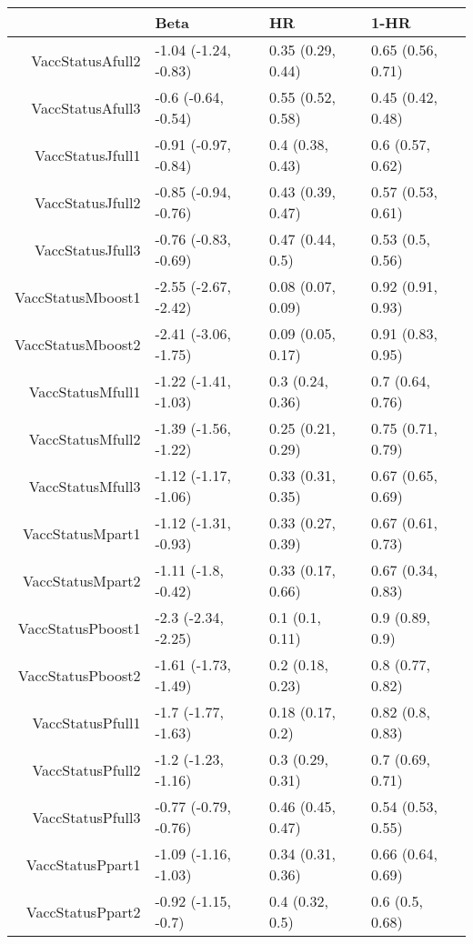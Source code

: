 \begin{table}[ht]
\centering
\begin{tabular}{rlll}
  \hline
 & Beta & HR & 1-HR \\ 
  \hline
VaccStatusAfull2 & -1.04 (-1.24, -0.83) & 0.35 (0.29, 0.44) & 0.65 (0.56, 0.71) \\ 
  VaccStatusAfull3 & -0.6 (-0.64, -0.54) & 0.55 (0.52, 0.58) & 0.45 (0.42, 0.48) \\ 
  VaccStatusJfull1 & -0.91 (-0.97, -0.84) & 0.4 (0.38, 0.43) & 0.6 (0.57, 0.62) \\ 
  VaccStatusJfull2 & -0.85 (-0.94, -0.76) & 0.43 (0.39, 0.47) & 0.57 (0.53, 0.61) \\ 
  VaccStatusJfull3 & -0.76 (-0.83, -0.69) & 0.47 (0.44, 0.5) & 0.53 (0.5, 0.56) \\ 
  VaccStatusMboost1 & -2.55 (-2.67, -2.42) & 0.08 (0.07, 0.09) & 0.92 (0.91, 0.93) \\ 
  VaccStatusMboost2 & -2.41 (-3.06, -1.75) & 0.09 (0.05, 0.17) & 0.91 (0.83, 0.95) \\ 
  VaccStatusMfull1 & -1.22 (-1.41, -1.03) & 0.3 (0.24, 0.36) & 0.7 (0.64, 0.76) \\ 
  VaccStatusMfull2 & -1.39 (-1.56, -1.22) & 0.25 (0.21, 0.29) & 0.75 (0.71, 0.79) \\ 
  VaccStatusMfull3 & -1.12 (-1.17, -1.06) & 0.33 (0.31, 0.35) & 0.67 (0.65, 0.69) \\ 
  VaccStatusMpart1 & -1.12 (-1.31, -0.93) & 0.33 (0.27, 0.39) & 0.67 (0.61, 0.73) \\ 
  VaccStatusMpart2 & -1.11 (-1.8, -0.42) & 0.33 (0.17, 0.66) & 0.67 (0.34, 0.83) \\ 
  VaccStatusPboost1 & -2.3 (-2.34, -2.25) & 0.1 (0.1, 0.11) & 0.9 (0.89, 0.9) \\ 
  VaccStatusPboost2 & -1.61 (-1.73, -1.49) & 0.2 (0.18, 0.23) & 0.8 (0.77, 0.82) \\ 
  VaccStatusPfull1 & -1.7 (-1.77, -1.63) & 0.18 (0.17, 0.2) & 0.82 (0.8, 0.83) \\ 
  VaccStatusPfull2 & -1.2 (-1.23, -1.16) & 0.3 (0.29, 0.31) & 0.7 (0.69, 0.71) \\ 
  VaccStatusPfull3 & -0.77 (-0.79, -0.76) & 0.46 (0.45, 0.47) & 0.54 (0.53, 0.55) \\ 
  VaccStatusPpart1 & -1.09 (-1.16, -1.03) & 0.34 (0.31, 0.36) & 0.66 (0.64, 0.69) \\ 
  VaccStatusPpart2 & -0.92 (-1.15, -0.7) & 0.4 (0.32, 0.5) & 0.6 (0.5, 0.68) \\ 

\end{tabular}
\end{table}
